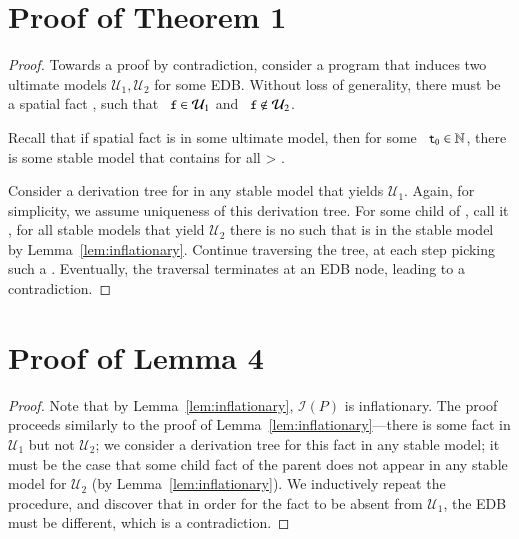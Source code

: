 \section{Proof of Theorem 1}
\begin{proof}
Towards a proof by contradiction, consider a \slang program that
induces two ultimate models $\mathcal{U}_1, \mathcal{U}_2$ for some EDB.  Without loss of generality, there must be a spatial fact , such that
$\dedalus{f} \in \mathcal{U}_1$ and $\dedalus{f} \not\in \mathcal{U}_2$.

Recall that if spatial fact  is in some ultimate model, then for some $\dedalus{t\sub{0}} \in \mathbb{N}$, there is some stable model that contains  for all  > .

Consider a derivation tree for  in any stable model that yields $\mathcal{U}_1$.  Again, for simplicity, we assume uniqueness of this derivation tree.  For some child of , call it , for all stable models that yield $\mathcal{U}_2$ there is no  such that  is in the stable model by Lemma~\ref{lem:inflationary}.  Continue traversing the tree, at each step picking such a .  Eventually, the traversal terminates at an EDB node, leading to a contradiction.
\end{proof}

\section{Proof of Lemma 4}
\begin{proof}                                                                  
Note that by Lemma~\ref{lem:inflationary}, $\mathcal{I}(P)$ is inflationary.  The proof proceeds similarly to the proof of Lemma~\ref{lem:inflationary}---there is some fact in $\mathcal{U}_1$ but not $\mathcal{U}_2$; we consider a derivation tree for this fact in any stable model; it must be the case that some child fact of the parent does not appear in any stable model for $\mathcal{U}_2$ (by Lemma~\ref{lem:inflationary}).  We inductively repeat the procedure, and discover that in order for the fact to be absent from $\mathcal{U}_1$, the EDB must be different, which is a contradiction.                                       
\end{proof}

